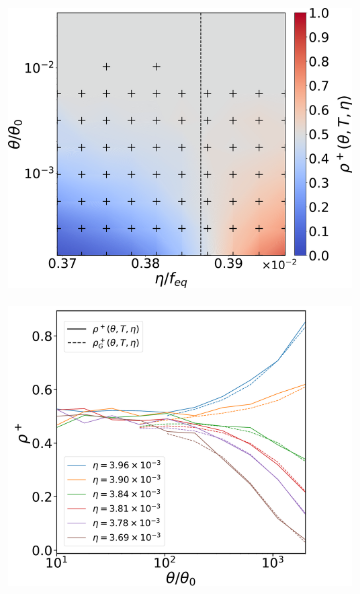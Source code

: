 \begin{figure} 
    \centering
     
    \begin{subfigure}[b]{0.49\textwidth}  
        \centering 
        \includegraphics[width=\textwidth]{figs_part1/mcmc/switch_noneq_channel_rates}
        \caption[]%
        {}    
        \label{fig:noneq switch channel rates}
    \end{subfigure}
    \hfill
    \begin{subfigure}[b]{0.495\textwidth}
        \centering
        \includegraphics[width=\textwidth]{figs_part1/mcmc/switch_noneq_channel_rates_line_plot}
        \caption[]%
        {}    
        \label{fig:noneq switch line plots}
    \end{subfigure}     


\end{figure}
